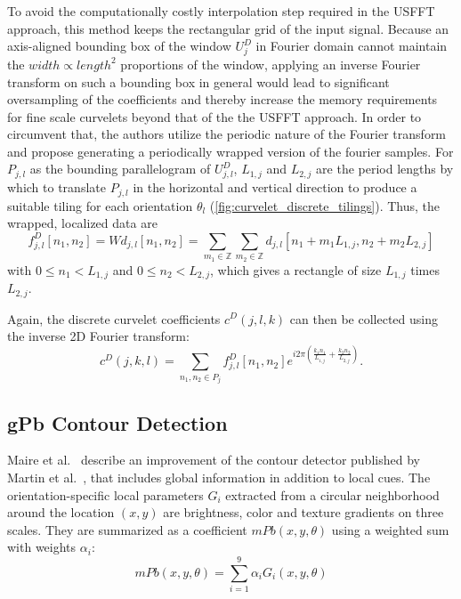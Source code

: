 To avoid the computationally costly interpolation step required in the USFFT
approach, this method keeps the rectangular grid of the input signal. Because
an axis-aligned bounding box of the window $U_j^D$ in Fourier domain cannot
maintain the $width \propto length^2$ proportions of the window, applying an
inverse Fourier transform on such a bounding box in general would lead to
significant oversampling of the coefficients and thereby increase the memory
requirements for fine scale curvelets beyond that of the the USFFT approach. In
order to circumvent that, the authors utilize the periodic nature of the
Fourier transform and propose generating a periodically wrapped version of the
fourier samples. For $P_{j, l}$ as the bounding parallelogram of $U_{j, l}^D$,
$L_{1, j}$ and $L_{2, j}$ are the period lengths by which to translate $P_{j,
l}$ in the horizontal and vertical direction to produce a suitable tiling for
each orientation $\theta_l$ (\autoref{fig:curvelet_discrete_tilings}). Thus,
the wrapped, localized data are
\begin{equation*}
    f_{j, l}^D[n_1, n_2] = W d_{j, l}[n_1, n_2] = \sum_{m_1 \in \mathbb{Z}} \sum_{m_2 \in \mathbb{Z}} d_{j, l}[n_1 + m_1 L_{1, j}, n_2 + m_2 L_{2, j}]
\end{equation*}
with $0 \leq n_1 < L_{1, j}$ and $0 \leq n_2 < L_{2, j}$, which gives a
rectangle of size $L_{1, j}$ times $L_{2, j}$.

Again, the discrete curvelet coefficients $c^D(j, l, k)$ can then be collected
using the inverse 2D Fourier transform:
\begin{equation*}
    c^D(j, k, l) = \sum_{n_1, n_2 \in P_j} f_{j, l}^D[n_1, n_2] e^{i 2 \pi \left(\frac{k_1 n_1}{L_{1, j}} + \frac{k_2 n_2}{L_{2,j}}\right)}.
\end{equation*}

\subsection{gPb Contour Detection}\label{sec:background_gpb}

Maire et al.\ \autocite{maire_using_2008} describe an improvement of the
contour detector published by Martin et al.\ \autocite{martin_learning_2004},
that includes global information in addition to local cues. The
orientation-specific local parameters $G_i$ extracted from a circular
neighborhood around the location $(x, y)$ are brightness, color and texture
gradients on three scales. They are summarized as a coefficient $mPb(x, y,
\theta)$ using a weighted sum with weights $\alpha_i$:
\begin{equation*}
    mPb(x, y, \theta) = \sum_{i=1}^9 \alpha_i G_i(x, y, \theta)
\end{equation*}

